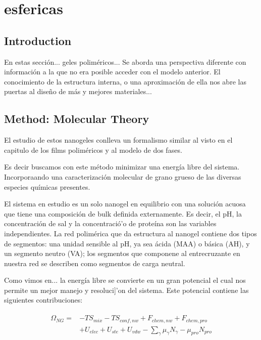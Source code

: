 \chapter{esfericas}

\section{Introduction}


En estas secci\'on... geles polim\'ericos... 
Se aborda una perspectiva diferente con informaci\'on a la que no era posible acceder con el modelo anterior.
El conocimiento  de la estructura interna, o una aproximaci\'on de ella nos abre las puertas al dise\~no de m\'as y mejores materiales...

\section{Method: Molecular Theory}

El estudio de estos nanogeles conlleva un formalismo similar al visto en el capitulo de los films polim\'ericos y al modelo de dos fases.


Es decir buscamos con este m\'etodo  minimizar una energ\'ia libre del sistema.
Incorporaando una caracterizaci\'on molecular de grano grueso de las diversas especies qu\'imicas presentes.

El sistema en estudio es un solo nanogel en equilibrio con una solución acuosa que tiene una composici\'on de bulk definida externamente.
Es decir, el pH, la concentraci\'on de sal y la concentració'o de prote\'ina son las variables independientes.
La red polim\'erica que da estructura al nanogel contiene dos tipos de segmentos: una unidad sensible al pH, ya sea \'acida (MAA) o b\'asica (AH), y un segmento neutro (VA);
los segmentos que componene al entrecruzante en nuestra red se describen como segmentos de carga neutral.

Como vimos en... la energ\'ia libre se convierte en un gran potencial el cual nos permite un mejor manejo y resoluci]'on del sistema.
Este potencial contiene las siguientes contribuciones:

\begin{align}
\begin{aligned}
\Omega_{NG}=& -TS_{mix} -TS_{conf,nw} + F_{chem,nw} + F_{chem,pro}\\
& + U_{elec} + U_{ste} + U_{vdw} - \sum_{\gamma}{\mu_\gamma N_\gamma} - \mu_{pro} N_{pro}
\end{aligned}
\label{eq:esf:semicano}
\end{align}


